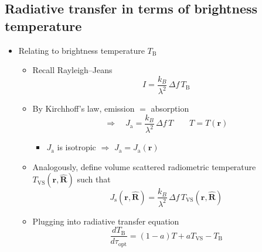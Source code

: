 \documentclass[11pt, oneside]{article}
\newcommand{\topt}{\tau_\mathrm{opt}}
\newcommand{\rv}{\mathbf{r}}
\newcommand{\Rh}{\hat{\mathbf{R}}}
\begin{document}
\subsection{Radiative transfer in terms of brightness temperature}
\label{s:rtetb}

\begin{itemize}
	\item Relating to brightness temperature $T_\mathrm{B}$
	\begin{itemize}
		\item[] Recall Rayleigh--Jeans
		\begin{equation}
			\label{e:ITB}
			I = \frac{k_B}{\lambda^2}\,\Delta f\,T_\mathrm{B}
		\end{equation}
		\item[] By Kirchhoff's law, emission $=$ absorption
		\begin{equation}
			\label{e:Ja}
			\Rightarrow\quad J_\mathrm{a} = \frac{k_B}{\lambda^2}\,\Delta f\,T \qquad T = T(\rv)
		\end{equation}
		\begin{itemize}
			\item[$\hookrightarrow$] $J_\mathrm{a}$ is isotropic $\Rightarrow$ $J_\mathrm{a} = J_\mathrm{a}(\rv)$
		\end{itemize}
		\item[] Analogously, define volume scattered radiometric temperature $T_\mathrm{VS}(\rv,\Rh)$ such that
		\begin{equation}
			\label{e:Js}
			J_\mathrm{s}(\rv,\Rh) = \frac{k_B}{\lambda^2}\,\Delta f\,T_\mathrm{VS}(\rv,\Rh)
		\end{equation}
		\item[] Plugging into radiative transfer equation
		\begin{equation}
			\label{e:RTETB}
			\boxed{\frac{dT_\mathrm{B}}{d\topt} = (1 - a)T + aT_\mathrm{VS} - T_\mathrm{B}}
		\end{equation}
	\end{itemize}
\end{itemize}
\end{document}
